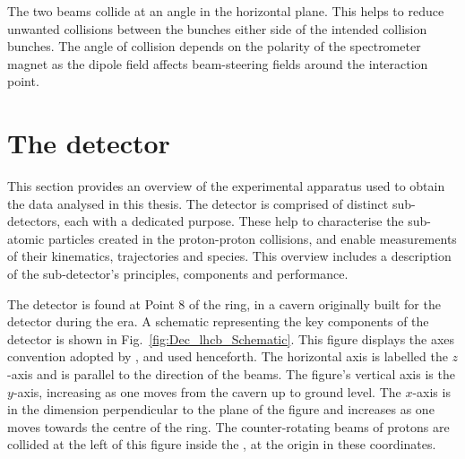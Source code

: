 The two beams collide at an angle in the horizontal plane. This helps to reduce unwanted collisions between the bunches either side of the intended collision bunches. The angle of collision depends on the polarity of the \lhcb spectrometer magnet as the dipole field affects beam-steering fields around the interaction point. 




\section{The \lhcb detector}

This section provides an overview of the experimental apparatus used to obtain the data analysed in this thesis.
The \lhcb detector is comprised of distinct sub-detectors, each with a dedicated purpose. These help to characterise the sub-atomic particles created in the proton-proton collisions, and enable measurements of their kinematics, trajectories and species.
This overview includes a description of the sub-detector's principles, components and performance. 

The \lhcb detector is found at Point 8 of the \lhc ring, in a cavern originally built for the \delphi detector during the \lep era. A schematic representing the key components of the \lhcb detector is shown in Fig.~\ref{fig:Dec_lhcb_Schematic}. This figure displays the axes convention adopted by \lhcb, and used henceforth. The horizontal axis is labelled the $z$-axis and is parallel to the direction of the beams. The figure's vertical axis is the $y$-axis, increasing as one moves from the cavern up to ground level. The $x$-axis is in the dimension perpendicular to the plane of the figure and increases as one moves towards the centre of the \lhc ring. The counter-rotating beams of protons are collided at the left of this figure inside the \velo, at the origin in these coordinates.   

